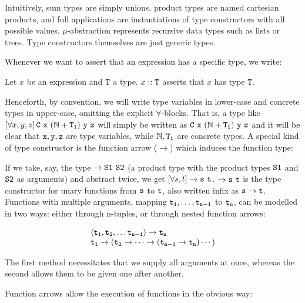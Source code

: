 Intuitively, sum types are simply unions, product types are named cartesian products, and full applications are instantiations of type constructors with all possible values. $\mu$-abstraction represents recursive data types such as lists or trees. Type constructors themselves are just generic types.

Whenever we want to assert that an expression has a specific type, we write:

\begin{notation}
	Let $x$ be an expression and $\mathtt{T}$ a type. $x :: \mathtt{T}$ asserts that $x$ has type $\mathtt{T}$.
\end{notation}

Henceforth, by convention, we will write type variables in lower-case and concrete types in upper-case, omitting the explicit $\forall$-blocks. That is, a type like $\allQ{x,y,z} \type{C\ x\ (\N + T_1)\ y\ z}$ will simply be written as $\mathtt{C\ x\ (\mathbb{N} + T_1)\ y\ z}$ and it will be clear that $\mathtt{x}, \mathtt{y}, \mathtt{z}$ are type variables, while $\mathbb{N}, \mathtt{T_1}$ are concrete types. A special kind of type constructor is the function arrow ($\rightarrow$) which induces the function type:

\begin{example}
	If we take, say, the type $\rightarrow \mathtt{S1}\ \mathtt{S2}$ (a product type with the product types $\mathtt{S1}$ and $\mathtt{S2}$ as arguments) and abstract twice, we get $\allQ{s,t} \rightarrow \type{s}\ \type{t}$. $\rightarrow \type{s}\ \type{t}$ is the type constructor for unary functions from $\mathtt{s}$ to $\mathtt{t}$, also written infix as $\mathtt{s} \rightarrow \mathtt{t}$. Functions with multiple arguments, mapping $\mathtt{t_1},\dots,\mathtt{t_{n-1}}$ to $\mathtt{t_n}$, can be modelled in two ways: either through n-tuples, or through nested function arrows:
	
	$$
		\begin{array}{l}
			\langle \mathtt{t_1}, \mathtt{t_2}, \dots \mathtt{t_{n-1}} \rangle \rightarrow \mathtt{t_n}\\
			\mathtt{t_1} \rightarrow (\mathtt{t_2} \rightarrow \dots \rightarrow (\mathtt{t_{n-1}} \rightarrow \mathtt{t_n})\cdots)
		\end{array}
	$$
	
	The first method necessitates that we supply all arguments at once, whereas the second allows them to be given one after another.
\end{example}

\noindent
Function arrows allow the execution of functions in the obvious way:

